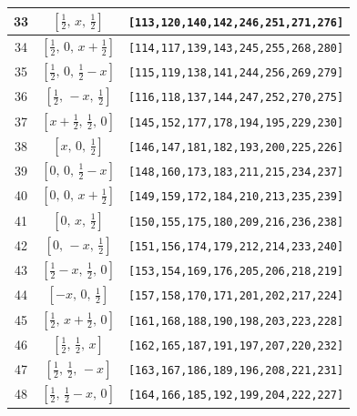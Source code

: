 \documentclass[fleqn,8pt]{jsarticle}
\begin{document}
\begin{longtable}{ccc}
33 & $\left[ \frac{1}{2},\, x,\, \frac{1}{2} \right]$ & {\tt [113,120,140,142,246,251,271,276]} \\ \hline
34 & $\left[ \frac{1}{2},\, 0,\, x + \frac{1}{2} \right]$ & {\tt [114,117,139,143,245,255,268,280]} \\ \hline
35 & $\left[ \frac{1}{2},\, 0,\, \frac{1}{2} - x \right]$ & {\tt [115,119,138,141,244,256,269,279]} \\ \hline
36 & $\left[ \frac{1}{2},\, - x,\, \frac{1}{2} \right]$ & {\tt [116,118,137,144,247,252,270,275]} \\ \hline
37 & $\left[ x + \frac{1}{2},\, \frac{1}{2},\, 0 \right]$ & {\tt [145,152,177,178,194,195,229,230]} \\ \hline
38 & $\left[ x,\, 0,\, \frac{1}{2} \right]$ & {\tt [146,147,181,182,193,200,225,226]} \\ \hline
39 & $\left[ 0,\, 0,\, \frac{1}{2} - x \right]$ & {\tt [148,160,173,183,211,215,234,237]} \\ \hline
40 & $\left[ 0,\, 0,\, x + \frac{1}{2} \right]$ & {\tt [149,159,172,184,210,213,235,239]} \\ \hline
41 & $\left[ 0,\, x,\, \frac{1}{2} \right]$ & {\tt [150,155,175,180,209,216,236,238]} \\ \hline
42 & $\left[ 0,\, - x,\, \frac{1}{2} \right]$ & {\tt [151,156,174,179,212,214,233,240]} \\ \hline
43 & $\left[ \frac{1}{2} - x,\, \frac{1}{2},\, 0 \right]$ & {\tt [153,154,169,176,205,206,218,219]} \\ \hline
44 & $\left[ - x,\, 0,\, \frac{1}{2} \right]$ & {\tt [157,158,170,171,201,202,217,224]} \\ \hline
45 & $\left[ \frac{1}{2},\, x + \frac{1}{2},\, 0 \right]$ & {\tt [161,168,188,190,198,203,223,228]} \\ \hline
46 & $\left[ \frac{1}{2},\, \frac{1}{2},\, x \right]$ & {\tt [162,165,187,191,197,207,220,232]} \\ \hline
47 & $\left[ \frac{1}{2},\, \frac{1}{2},\, - x \right]$ & {\tt [163,167,186,189,196,208,221,231]} \\ \hline
48 & $\left[ \frac{1}{2},\, \frac{1}{2} - x,\, 0 \right]$ & {\tt [164,166,185,192,199,204,222,227]} \\
\end{longtable}
\renewcommand{\arraystretch}{1.2}
\end{document}
